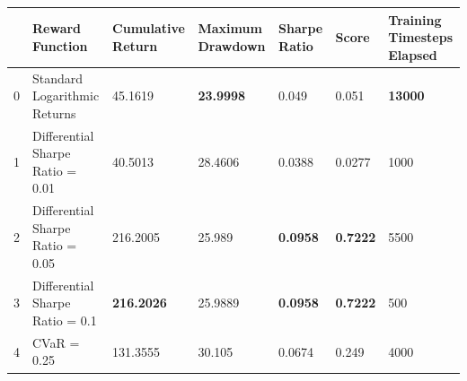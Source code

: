 \begin{tabular}{lllllll}
\toprule
 & Reward Function & Cumulative Return & Maximum Drawdown & Sharpe Ratio & Score & Training Timesteps Elapsed \\
\midrule
0 & Standard Logarithmic Returns & 45.1619 & \textbf{23.9998} & 0.049 & 0.051 & \textbf{13000} \\
1 & Differential Sharpe Ratio = 0.01 & 40.5013 & 28.4606 & 0.0388 & 0.0277 & 1000 \\
2 & Differential Sharpe Ratio = 0.05 & 216.2005 & 25.989 & \textbf{0.0958} & \textbf{0.7222} & 5500 \\
3 & Differential Sharpe Ratio = 0.1 & \textbf{216.2026} & 25.9889 & \textbf{0.0958} & \textbf{0.7222} & 500 \\
4 & CVaR = 0.25 & 131.3555 & 30.105 & 0.0674 & 0.249 & 4000 \\
\bottomrule
\end{tabular}
